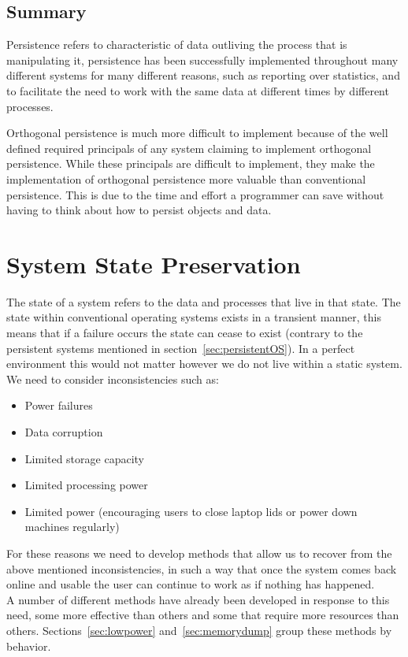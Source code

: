 \documentclass[a4paper,12pt]{article}
\begin{document}
\subsection{Summary}
Persistence refers to characteristic of data outliving the process that is manipulating it, persistence has been successfully implemented throughout many different systems for many different reasons, such as reporting over statistics, and to facilitate the need to work with the same data at different times by different processes. 
\par
Orthogonal persistence is much more difficult to implement because of the well defined required principals of any system claiming to implement orthogonal persistence. While these principals are difficult to implement, they make the implementation of orthogonal persistence more valuable than conventional persistence. This is due to the time and effort a programmer can save without having to think about how to persist objects and data. 

\section{System State Preservation}\label{sec:preservation}
The state of a system refers to the data and processes that live in that state. The state within conventional operating systems exists in a transient manner, this means that if a failure occurs the state can cease to exist (contrary to the persistent systems mentioned in section~\ref{sec:persistentOS}). In a perfect environment this would not matter however we do not live within a static system. We need to consider inconsistencies such as:
\begin{itemize}
    \item{Power failures}
    \item{Data corruption}
    \item{Limited storage capacity}
    \item{Limited processing power}
    \item{Limited power (encouraging users to close laptop lids or power down machines regularly)}
\end{itemize}
For these reasons we need to develop methods that allow us to recover from the above mentioned inconsistencies, in such a way that once the system comes back online and usable the user can continue to work as if nothing has happened.
\\A number of different methods have already been developed in response to this need, some more effective than others and some that require more resources than others. Sections~\ref{sec:lowpower} and~\ref{sec:memorydump} group these methods by behavior.
\end{document}
